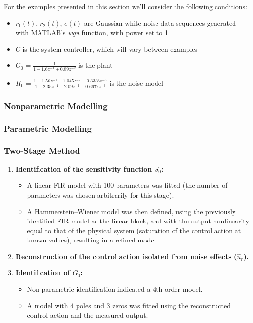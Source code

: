 \documentclass[10pt]{extarticle}
\begin{document}
For the examples presented in this section we'll consider the following conditions:
\begin{itemize}
    \item $r_{1}(t)$, $r_{2}(t)$, $e(t)$ are Gaussian white noise data sequences generated with MATLAB's \emph{wgn} function, with power set to 1
    \item $C$ is the system controller, which will vary between examples
    \item $G_{0} = \frac{1}{1-1.6z^{-1}+0.89z^{-2}}$ is the plant
    \item $H_{0} = \frac{1 - 1.56z^{-1} + 1.045z^{-2} -0.3338z^{-3}}{1 - 2.35z^{-1} + 2.09z^{-2} -0.6675z^{-3}}$ is the noise model
\end{itemize}

\subsubsection{Nonparametric Modelling}\label{Nonparametric Modelling}

\subsubsection{Parametric Modelling}\label{Parametric Modelling}

\subsubsection{Two-Stage Method}\label{Two-Stage Method}




\begin{enumerate}
    \item \textbf{Identification of the sensitivity function $S_0$:}
    \begin{itemize}
        \item A linear FIR model with 100 parameters was fitted (the number of parameters was chosen arbitrarily for this stage).
        \item A Hammerstein--Wiener model was then defined, using the previously identified FIR model as the linear block, and with the output nonlinearity equal to that of the physical system (saturation of the control action at known values), resulting in a refined model.
    \end{itemize}
    
    \item \textbf{Reconstruction of the control action isolated from noise effects ($\hat{u}_r$).}
    
    \item \textbf{Identification of $G_0$:}
    \begin{itemize}
        \item Non-parametric identification indicated a 4th-order model.
        \item A model with 4 poles and 3 zeros was fitted using the reconstructed control action and the measured output.
    \end{itemize}
\end{enumerate}
\end{document}
